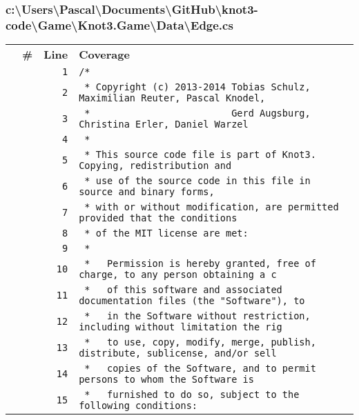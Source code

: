 \documentclass[a4paper,10pt]{article}
\begin{document}
\subsubsection{c:\textbackslash Users\textbackslash Pascal\textbackslash Documents\textbackslash GitHub\textbackslash knot3-code\textbackslash Game\textbackslash Knot3.Game\textbackslash Data\textbackslash Edge.cs}
\begin{longtable}[l]{lrrl}
\textbf{} & \textbf{\#} & \textbf{Line} & \textbf{Coverage}\\
\cellcolor{gray} &  & \verb~1~ & \verb~/*~\\
\cellcolor{gray} &  & \verb~2~ & \verb~ * Copyright (c) 2013-2014 Tobias Schulz, Maximilian Reuter, Pascal Knodel,~\\
\cellcolor{gray} &  & \verb~3~ & \verb~ *                         Gerd Augsburg, Christina Erler, Daniel Warzel~\\
\cellcolor{gray} &  & \verb~4~ & \verb~ *~\\
\cellcolor{gray} &  & \verb~5~ & \verb~ * This source code file is part of Knot3. Copying, redistribution and~\\
\cellcolor{gray} &  & \verb~6~ & \verb~ * use of the source code in this file in source and binary forms,~\\
\cellcolor{gray} &  & \verb~7~ & \verb~ * with or without modification, are permitted provided that the conditions~\\
\cellcolor{gray} &  & \verb~8~ & \verb~ * of the MIT license are met:~\\
\cellcolor{gray} &  & \verb~9~ & \verb~ *~\\
\cellcolor{gray} &  & \verb~10~ & \verb~ *   Permission is hereby granted, free of charge, to any person obtaining a c~\\
\cellcolor{gray} &  & \verb~11~ & \verb~ *   of this software and associated documentation files (the "Software"), to ~\\
\cellcolor{gray} &  & \verb~12~ & \verb~ *   in the Software without restriction, including without limitation the rig~\\
\cellcolor{gray} &  & \verb~13~ & \verb~ *   to use, copy, modify, merge, publish, distribute, sublicense, and/or sell~\\
\cellcolor{gray} &  & \verb~14~ & \verb~ *   copies of the Software, and to permit persons to whom the Software is~\\
\cellcolor{gray} &  & \verb~15~ & \verb~ *   furnished to do so, subject to the following conditions:~\\

\end{longtable}
\end{document}
